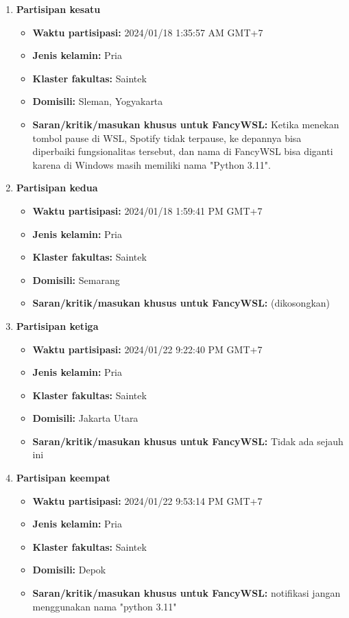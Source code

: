 \begin{enumerate}
    \item \textbf{Partisipan kesatu}
    \begin{itemize}
        \item \textbf{Waktu partisipasi:} 2024/01/18 1:35:57 AM GMT+7
        \item \textbf{Jenis kelamin:} Pria
        \item \textbf{Klaster fakultas:} Saintek
        \item \textbf{Domisili:} Sleman, Yogyakarta
        \item \textbf{Saran/kritik/masukan khusus untuk FancyWSL:} Ketika menekan tombol pause di WSL, Spotify tidak terpause, ke depannya bisa diperbaiki fungsionalitas tersebut, dan nama di FancyWSL bisa diganti karena di Windows masih memiliki nama "Python 3.11".
    \end{itemize}

    \item \textbf{Partisipan kedua}
    \begin{itemize}
        \item \textbf{Waktu partisipasi:} 2024/01/18 1:59:41 PM GMT+7
        \item \textbf{Jenis kelamin:} Pria
        \item \textbf{Klaster fakultas:} Saintek
        \item \textbf{Domisili:} Semarang
        \item \textbf{Saran/kritik/masukan khusus untuk FancyWSL:} (dikosongkan)
    \end{itemize}

    \item \textbf{Partisipan ketiga}
    \begin{itemize}
        \item \textbf{Waktu partisipasi:} 2024/01/22 9:22:40 PM GMT+7
        \item \textbf{Jenis kelamin:} Pria
        \item \textbf{Klaster fakultas:} Saintek
        \item \textbf{Domisili:} Jakarta Utara
        \item \textbf{Saran/kritik/masukan khusus untuk FancyWSL:} Tidak ada sejauh ini

    \end{itemize}

    \item \textbf{Partisipan keempat}
    \begin{itemize}
        \item \textbf{Waktu partisipasi:} 2024/01/22 9:53:14 PM GMT+7
        \item \textbf{Jenis kelamin:} Pria
        \item \textbf{Klaster fakultas:} Saintek
        \item \textbf{Domisili:} Depok
        \item \textbf{Saran/kritik/masukan khusus untuk FancyWSL:} notifikasi jangan menggunakan nama "python 3.11"
    \end{itemize}


\end{enumerate}
